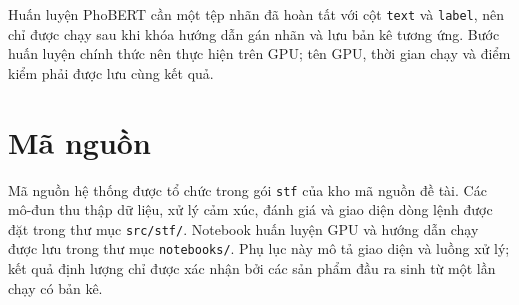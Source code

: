 Huấn luyện PhoBERT cần một tệp nhãn đã hoàn tất với cột \texttt{text} và
\texttt{label}, nên chỉ được chạy sau khi khóa hướng dẫn gán nhãn và lưu bản kê
tương ứng. Bước huấn luyện chính thức nên thực hiện trên GPU; tên GPU, thời gian chạy
và điểm kiểm phải được lưu cùng kết quả.

\section{Mã nguồn}

Mã nguồn hệ thống được tổ chức trong gói \texttt{stf} của kho mã nguồn đề tài.
Các mô-đun thu thập dữ liệu, xử lý cảm xúc, đánh giá và giao diện dòng lệnh được đặt trong thư mục
\texttt{src/stf/}. Notebook huấn luyện GPU và hướng dẫn chạy được lưu trong thư mục
\texttt{notebooks/}. Phụ lục này mô tả giao diện và luồng xử lý; kết quả định lượng
chỉ được xác nhận bởi các sản phẩm đầu ra sinh từ một lần chạy có bản kê.
